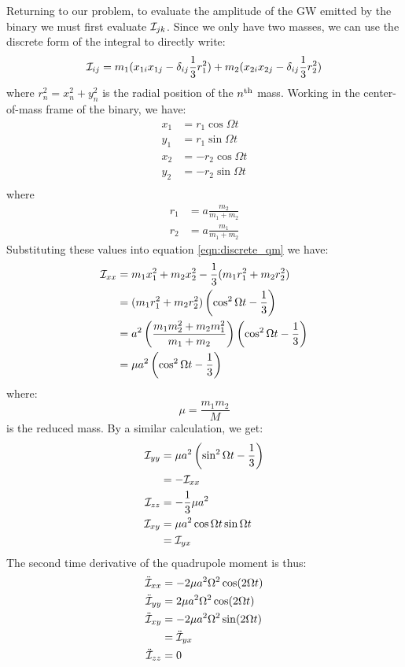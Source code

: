 Returning to our problem, to evaluate the amplitude of the \ac{GW} emitted by the binary we must first evaluate $\mathcal{I}_{jk}$. Since we only have two masses, we can use the discrete form of the integral to directly write:
\begin{equation}
\label{eqn:discrete_qm}
\qI_{ij} = m_1(x_{1i}x_{1j} - \delta_{ij}\frac{1}{3} r_1^2) + m_2(x_{2i}x_{2j} - \delta_{ij}\frac{1}{3}r_2^2)
\end{equation}
where $r_n^2 = x_n^2 + y_n^2$ is the radial position of the $n^{\mathrm{th}}$ mass. Working in the center-of-mass frame of the binary, we have:
\begin{align*}
x_1 &= r_1 \cos \Omega t \\
y_1 &= r_1 \sin \Omega t \\
x_2 &= - r_2 \cos \Omega t \\
y_2 &= - r_2 \sin \Omega t \\
\end{align*}
where
\begin{align}
r_1 &= a\frac{m_2}{m_1 + m_2} \\
r_2 &= a \frac{m_1}{m_1 + m_2}
\end{align}
Substituting these values into equation \ref{eqn:discrete_qm} we have:
\begin{align}
\mathcal{I}_{xx} &= m_1 x_1^2 + m_2 x_2^2 - \frac{1}{3}(m_1r_1^2 + m_2r_2^2) \nonumber \\
         &= (m_1r_1^2 + m_2r_2^2)\left(\cos^2 \Omega t - \frac{1}{3}\right) \nonumber \\
         &= a^2\left(\frac{m_1m_2^2 + m_2m_1^2}{m_1+m_2}\right)\left(\cos^2 \Omega t - \frac{1}{3}\right) \nonumber \\
         &= \mu a^2 \left(\cos^2 \Omega t - \frac{1}{3} \right)
\end{align}
where:
\begin{equation}
\label{eqn:reduced_mass}
\mu = \frac{m_1 m_2}{M}
\end{equation}
is the reduced mass. By a similar calculation, we get:
\begin{align}
\mathcal{I}_{yy} &= \mu a^2 \left(\sin^2 \Omega t - \frac{1}{3}\right) \\
         &= -\mathcal{I}_{xx} \\
\mathcal{I}_{zz} &= -\frac{1}{3} \mu a^2 \\
\mathcal{I}_{xy} &= \mu a^2 \cos \Omega t \sin \Omega t \\
         &= \mathcal{I}_{yx}
\end{align}
The second time derivative of the quadrupole moment is thus:
\begin{subequations}
\begin{align}
\ddot{\mathcal{I}}_{xx} &=  -2\mu a^2\Omega^2 \cos(2\Omega t) \\
\ddot{\mathcal{I}}_{yy} &=  2\mu a^2\Omega^2 \cos(2\Omega t)  \\
\ddot{\mathcal{I}}_{xy} &=  -2 \mu a^2 \Omega^2 \sin(2 \Omega t) \\
                &=  \ddot{\mathcal{I}}_{yx} \\
\ddot{\mathcal{I}}_{zz} &=  0
\end{align}
\label{eqn:second_deriv_qm}
\end{subequations}

